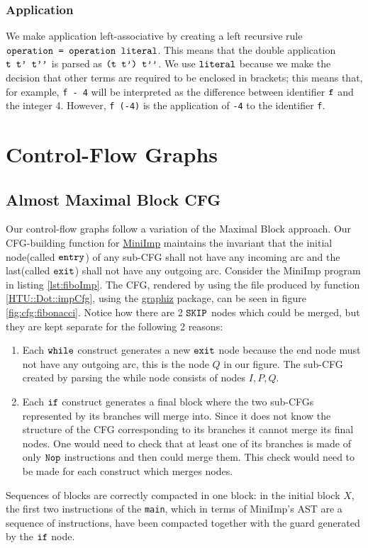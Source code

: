 \documentclass[a4paper,11pt]{report}
\begin{document}
\subsubsection{Application}


We make application left-associative by creating a left recursive rule \\$\verb|operation = operation literal|$.
This means that the double application $\verb|t t' t''|$ is parsed as $\verb|(t t') t''|$. We use $\verb|literal|$ because we make the decision that other terms are required to be enclosed in brackets; this means that, for example, \verb|f - 4| will be interpreted as the difference between identifier $\verb|f|$ and the integer 4. However, \verb|f (-4)| is the application of \verb|-4| to the identifier \verb|f|. 

\section{Control-Flow Graphs}\label{Section::CFG}


\subsection{Almost Maximal Block CFG}
Our control-flow graphs follow a variation of the Maximal Block approach.
Our CFG-building function for \hyperref[Section::MiniImp]{MiniImp} maintains the invariant that the initial node(called $\verb|entry|$) of any sub-CFG shall not have any incoming arc and the last(called $\verb|exit|$) shall not have any outgoing arc.
Consider the MiniImp program in listing \ref{lst:fiboImp}. The CFG, rendered by using the file produced by function \ref{HTU::Dot::impCfg}, using the \href{https://graphviz.org/download/}{graphiz} package, can be seen in figure \ref{fig:cfg:fibonacci}.
Notice how there are 2 $\verb|SKIP|$ nodes which could be merged, but they are kept separate for the following 2 reasons:
\begin{enumerate}
  \item Each $\verb|while|$ construct generates a new $\verb|exit|$ node because the end node must not have any outgoing arc, this is the node $Q$ in our figure. The sub-CFG created by parsing the while node consists of nodes $I, P, Q$.
  \item Each $\verb|if|$ construct generates a final block where the two sub-CFGs represented by its branches will merge into. Since it does not know the structure of the CFG corresponding to its branches it cannot merge its final nodes. One would need to check that at least one of its branches is made of only $\verb|Nop|$ instructions and then could merge them. This check would need to be made for each construct which merges nodes.
 \end{enumerate}
Sequences of blocks are correctly compacted in one block: in the initial block $X$, the first two instructions of the \verb|main|, which in terms of MiniImp's AST are a sequence of instructions, have been compacted together with the guard generated by the $\verb|if|$ node.
\end{document}
